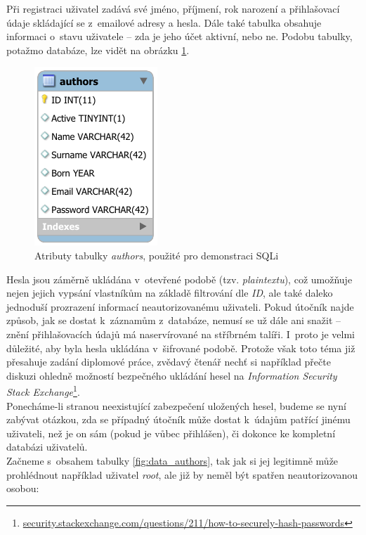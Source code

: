 Při registraci uživatel zadává své jméno, příjmení, rok narození a přihlašovací údaje skládající se z~emailové adresy a hesla. Dále také tabulka
obsahuje informaci o~stavu uživatele -- zda je jeho účet aktivní, nebo ne. Podobu tabulky, potažmo databáze, lze vidět na obrázku \ref{fig:authors}. \\

\begin{figure}[h!]
    \label{fig:authors}
    \centering
    \includegraphics[scale=1.4]{obrazky-figures/authors.pdf}
    \caption{Atributy tabulky \textit{authors}, použité pro demonstraci SQLi}
\end{figure}

Hesla jsou záměrně ukládána v~otevřené podobě (tzv. \textit{plaintextu}), což umožňuje nejen jejich vypsání vlastníkům na základě filtrování dle 
\textit{ID}, ale také daleko jednoduší prozrazení informací neautorizovanému uživateli. Pokud útočník najde způsob, jak se dostat k~záznamům 
z~databáze, nemusí se už dále ani snažit -- znění přihlašovacích údajů má naservírované na stříbrném talíři. I~proto je velmi důležité, aby byla 
hesla ukládána v~šifrované podobě. Protože však toto téma již přesahuje zadání diplomové práce, zvědavý čtenář nechť si například přečte diskuzi 
ohledně možností bezpečného ukládání hesel na \textit{Information Security Stack 
Exchange}\footnote{\url{security.stackexchange.com/questions/211/how-to-securely-hash-passwords}}. \\

Ponecháme-li stranou neexistující zabezpečení uložených hesel, budeme se nyní zabývat otázkou, zda se případný útočník může dostat k~údajům patřící
jinému uživateli, než je on sám (pokud je vůbec přihlášen), či dokonce ke kompletní databázi uživatelů. \\

\Bat{} Začneme s~obsahem tabulky \ref{fig:data_authors}, tak jak si jej legitimně může prohlédnout například \mbox{uživatel} \textit{root},
ale již by neměl být spatřen neautorizovanou osobou:

